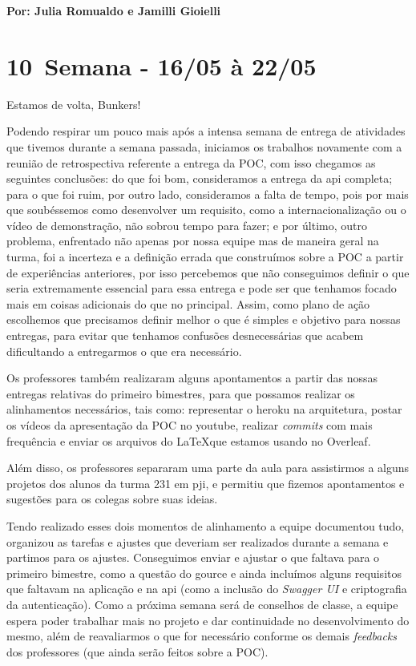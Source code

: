 \textbf{Por: Julia Romualdo e Jamilli Gioielli}

\section{10\textordfeminine \, Semana - 16/05 à 22/05}
Estamos de volta, Bunkers!

Podendo respirar um pouco mais após a intensa semana de entrega de atividades que tivemos durante a semana passada, iniciamos os trabalhos novamente com a reunião de retrospectiva referente a entrega da \gls{POC}, com isso chegamos as seguintes conclusões: do que foi bom, consideramos a entrega da \acs{api} completa;  para o que foi ruim, por outro lado, consideramos a falta de tempo, pois por mais que soubéssemos como desenvolver um requisito, como a internacionalização ou o vídeo de demonstração, não sobrou tempo para fazer; e por último, outro problema, enfrentado não apenas por nossa equipe mas de maneira geral na turma, foi a incerteza e a definição errada que construímos sobre a \gls{POC} a partir de experiências anteriores, por isso percebemos que não conseguimos definir o que seria extremamente essencial para essa entrega e pode ser que tenhamos focado mais em coisas adicionais do que no principal. Assim, como plano de ação escolhemos que precisamos definir melhor o que é simples e objetivo para nossas entregas, para evitar que tenhamos confusões desnecessárias que acabem dificultando a entregarmos o que era necessário.

Os professores também realizaram alguns apontamentos a partir das nossas entregas relativas do primeiro bimestres, para que possamos realizar os alinhamentos necessários, tais como: representar o \gls{heroku} na arquitetura, postar os vídeos da apresentação da \gls{POC} no \gls{youtube}, realizar \textit{commits} com mais frequência e enviar os arquivos do \LaTeX que estamos usando no Overleaf.

Além disso, os professores separaram uma parte da aula para assistirmos a alguns projetos dos alunos da turma 231 em \acs{pji}, e permitiu que fizemos apontamentos e sugestões para os colegas sobre suas ideias.

Tendo realizado esses dois momentos de alinhamento a equipe documentou tudo, organizou as tarefas e ajustes que deveriam ser realizados durante a semana e partimos para os ajustes. Conseguimos enviar e ajustar o que faltava para o primeiro bimestre, como a questão do \gls{gource} e ainda incluímos alguns requisitos que faltavam na aplicação e na \gls{api} (como a inclusão do \textit{Swagger UI} e criptografia da autenticação). Como a próxima semana será de conselhos de classe, a equipe espera poder trabalhar mais no projeto e dar continuidade no desenvolvimento do mesmo, além de reavaliarmos o que for necessário conforme os demais \textit{feedbacks} dos professores (que ainda serão feitos sobre a \acs{POC}).

